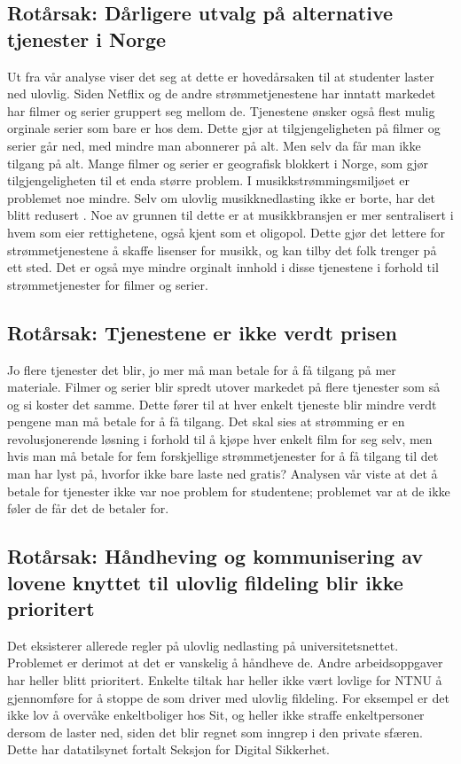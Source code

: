 \subsection{Rotårsak: Dårligere utvalg på alternative tjenester i Norge}
Ut fra vår analyse viser det seg at dette er hovedårsaken til at studenter laster ned ulovlig. Siden Netflix og de andre strømmetjenestene har inntatt markedet har filmer og serier gruppert seg mellom de. Tjenestene ønsker også flest mulig orginale serier som bare er hos dem. Dette gjør at tilgjengeligheten på filmer og serier går ned, med mindre man abonnerer på alt. Men selv da får man ikke tilgang på alt. Mange filmer og serier er geografisk blokkert i Norge, som gjør tilgjengeligheten til et enda større problem. I musikkstrømmingsmiljøet er problemet noe mindre. Selv om ulovlig musikknedlasting ikke er borte, har det blitt redusert \cite{musikkstream}. Noe av grunnen til dette er at musikkbransjen er mer sentralisert i hvem som eier rettighetene, også kjent som et oligopol. Dette gjør det lettere for strømmetjenestene å skaffe lisenser for musikk, og kan tilby det folk trenger på ett sted. Det er også mye mindre orginalt innhold i disse tjenestene i forhold til strømmetjenester for filmer og serier. 

\subsection{Rotårsak: Tjenestene er ikke verdt prisen}
Jo flere tjenester det blir, jo mer må man betale for å få tilgang på mer materiale. Filmer og serier blir spredt utover markedet på flere tjenester som så og si koster det samme. Dette fører til at hver enkelt tjeneste blir mindre verdt pengene man må betale for å få tilgang. Det skal sies at strømming er en revolusjonerende løsning i forhold til å kjøpe hver enkelt film for seg selv, men hvis man må betale for fem forskjellige strømmetjenester for å få tilgang til det man har lyst på, hvorfor ikke bare laste ned gratis? Analysen vår viste at det å betale for tjenester ikke var noe problem for studentene; problemet var at de ikke føler de får det de betaler for. 

\subsection{Rotårsak: Håndheving og kommunisering av lovene knyttet til ulovlig fildeling blir ikke prioritert}
Det eksisterer allerede regler på ulovlig nedlasting på universitetsnettet. Problemet er derimot at det er vanskelig å håndheve de. Andre arbeidsoppgaver har heller blitt prioritert. Enkelte tiltak har heller ikke vært lovlige for NTNU å gjennomføre for å stoppe de som driver med ulovlig fildeling. For eksempel er det ikke lov å overvåke enkeltboliger hos Sit, og heller ikke straffe enkeltpersoner dersom de laster ned, siden det blir regnet som inngrep i den private sfæren. Dette har datatilsynet fortalt Seksjon for Digital Sikkerhet. 

